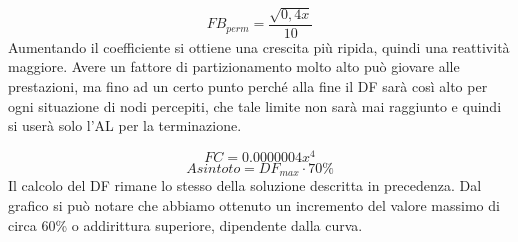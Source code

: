 \begin{equation}
	FB_{perm}=\dfrac{\sqrt{0,4x}}{10}\nonumber
\end{equation}
Aumentando il coefficiente si ottiene una crescita più ripida, quindi una reattività maggiore. Avere un fattore di partizionamento molto alto può giovare alle prestazioni, ma fino ad un certo punto perché alla fine il \acs{DF} sarà così alto per ogni situazione di nodi percepiti, che tale limite non sarà mai raggiunto e quindi si userà solo l'\acs{AL} per la terminazione.
\medskip

\begin{equation}
	FC = 0.0000004x^4 \nonumber
\end{equation}
\begin{equation}
	\label{eq:df_asintoto_perm}
	Asintoto = DF_{max}\cdot 70\%
\end{equation}
Il calcolo del \acs{DF} rimane lo stesso della soluzione descritta in precedenza. Dal grafico si può notare che abbiamo ottenuto un incremento del valore massimo di circa 60\% o addirittura superiore, dipendente dalla curva.
\bigskip

